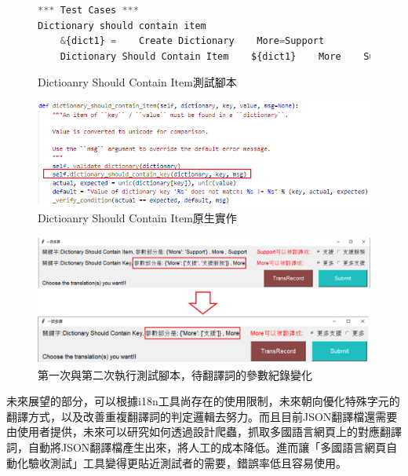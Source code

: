 \begin{figure}[H]
\centering
\begin{lstlisting}[language={python}]
*** Test Cases ***
Dictionary should contain item
    &{dict1} =    Create Dictionary    More=Support
    Dictionary Should Contain Item    ${dict1}    More    Support
\end{lstlisting}
\caption{Dictioanry Should Contain Item測試腳本}
\end{figure}

\begin{figure}[H]
\centering
\includegraphics[width= \textwidth]{../論文截圖/5-1-2 dictionary should contain item測試腳本與其原生實作.png}
\caption{Dictioanry Should Contain Item原生實作}
\end{figure}

\begin{figure}[H]
\centering
\includegraphics[width= \textwidth]{../論文截圖/5-1-3 1st&2nd執行測試腳本，待翻譯詞的參數紀錄變化.png}
\caption{第一次與第二次執行測試腳本，待翻譯詞的參數紀錄變化}
\end{figure}

未來展望的部分，可以根據i18n工具尚存在的使用限制，未來朝向優化特殊字元的翻譯方式，以及改善重複翻譯詞的判定邏輯去努力。而且目前JSON翻譯檔還需要由使用者提供，未來可以研究如何透過設計爬蟲，抓取多國語言網頁上的對應翻譯詞，自動將JSON翻譯檔產生出來，將人工的成本降低。進而讓「多國語言網頁自動化驗收測試」工具變得更貼近測試者的需要，錯誤率低且容易使用。
